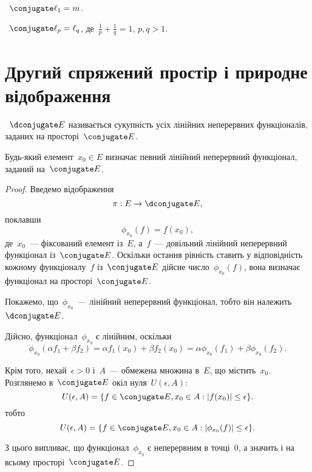 \begin{example}
   ~$\conjugate \ell_1 = m$.
\end{example}

\begin{example}
   ~$\conjugate \ell_p = \ell_q$, де~$\frac{1}{p} + \frac{1}{q} = 1$, $p, q > 1$.
\end{example}

\section{Другий спряжений простір і природне відображення}

\begin{definition}
    ~$\dconjugate E$ називається сукупність усіх лінійних неперервних функціоналів, заданих на просторі~$\conjugate E$.
\end{definition}

\begin{lemma}
    Будь-який елемент~$x_0 \in E$ визначає певний лінійний неперервний функціонал, заданий на~$\conjugate E$.
\end{lemma}

\begin{proof}
    Введемо відображення
    \begin{equation*}
        \pi: E \to \dconjugate E,
    \end{equation*}
    поклавши
    \begin{equation*}
        \phi_{x_0}(f) = f(x_0),
    \end{equation*}
    де~$x_0$~--- фіксований елемент із~$E$, а~$f$~--- довільний лінійний неперервний функціонал із~$\conjugate E$. Оскільки остання рівність ставить у відповідність кожному функціоналу~$f$ із~$\conjugate E$ дійсне число~$\phi_{x_0}(f)$, вона визначає функціонал на просторі~$\conjugate E$.
    
    Покажемо, що~$\phi_{x_0}$~--- лінійний неперервний функціонал, тобто він належить~$\dconjugate E$.
    
    Дійсно, функціонал~$\phi_{x_0}$ є лінійним, оскільки
    \begin{equation*}
        \phi_{x_0}(\alpha f_1 + \beta f_2) =
        \alpha f_1(x_0) + \beta f_2(x_0) =
        \alpha \phi_{x_0}(f_1) + \beta \phi_{x_0}(f_2).
    \end{equation*}
    
    Крім того, нехай~$\epsilon > 0$ і~$A$~--- обмежена множина в~$E$, що містить~$x_0$. Розглянемо в~$\conjugate E$ окіл нуля~$U(\epsilon, A)$:
    \begin{equation*}
        U(\epsilon, A) = \{f \in \conjugate E, x_0 \in A: |f(x_0)| \le \epsilon\}.
    \end{equation*}
    тобто
    \begin{equation*}
        U(\epsilon, A) = \{f \in \conjugate E, x_0 \in A: |\phi_{x_0}(f)| \le \epsilon\}.
    \end{equation*}

    З цього випливає, що функціонал~$\phi_{x_0}$ є неперервним в точці~$0$, а значить і на всьому просторі~$\conjugate E$. 
\end{proof}

